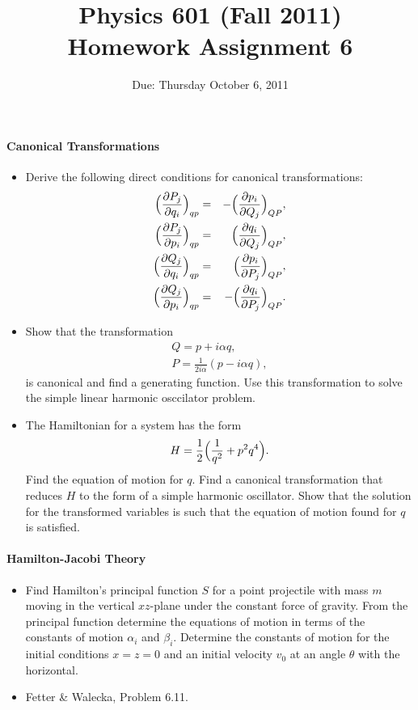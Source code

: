 \documentclass[letterpaper,11pt]{article}
\title{Physics 601 (Fall 2011) \\ Homework Assignment 6}
\date{Due: Thursday October 6, 2011}
\begin{document}
\maketitle

\paragraph*{Canonical Transformations}
\begin{itemize}
 \item Derive the following direct conditions for canonical transformations:
 \begin{eqnarray*}
  \Bigl( \frac{\partial P_j}{\partial q_i} \Bigr)_{qp} & = & - \Bigl( \frac{\partial p_i}{\partial Q_j} \Bigr)_{QP}, \\
  \Bigl( \frac{\partial P_j}{\partial p_i} \Bigr)_{qp} & = & \Bigl( \frac{\partial q_i}{\partial Q_j} \Bigr)_{QP}, \\
  \Bigl( \frac{\partial Q_j}{\partial q_i} \Bigr)_{qp} & = & \Bigl( \frac{\partial p_i}{\partial P_j} \Bigr)_{QP}, \\
  \Bigl( \frac{\partial Q_j}{\partial p_i} \Bigr)_{qp} & = & - \Bigl( \frac{\partial q_i}{\partial P_j} \Bigr)_{QP}.
 \end{eqnarray*}
 \item Show that the transformation
 \begin{eqnarray*}
  Q = p + i \alpha q, \\
  P = \frac{1}{2i\alpha}(p-i\alpha q),
 \end{eqnarray*}
 is canonical and find a generating function.  Use this transformation to solve the simple linear harmonic osccilator problem.
 \item The Hamiltonian for a system has the form
 \begin{equation*}
  H = \frac{1}{2} \Bigl( \frac{1}{q^2} + p^2 q^4 \Bigr).
 \end{equation*}
 Find the equation of motion for $q$.  Find a canonical transformation that reduces $H$ to the form of a simple harmonic oscillator.  Show that the solution for the transformed variables is such that the equation of motion found for $q$ is satisfied.
\end{itemize}

\paragraph*{Hamilton-Jacobi Theory}
\begin{itemize}
 \item Find Hamilton's principal function $S$ for a point projectile with mass $m$ moving in the vertical $xz$-plane under the constant force of gravity.  From the principal function determine the equations of motion in terms of the constants of motion $\alpha_i$ and $\beta_i$.  Determine the constants of motion for the initial conditions $x=z=0$ and an initial velocity $v_0$ at an angle $\theta$ with the horizontal.
 \item Fetter \& Walecka, Problem 6.11.
\end{itemize}
\end{document}
